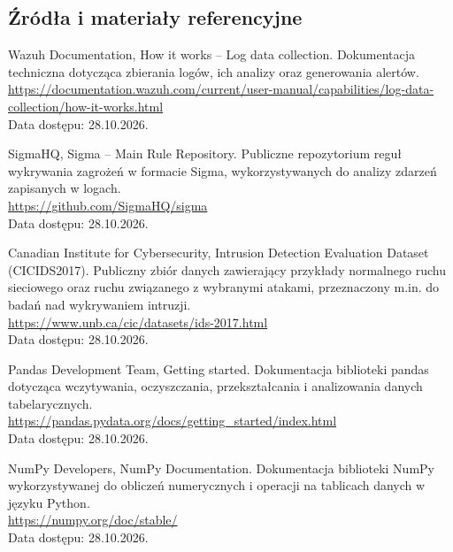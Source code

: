 \documentclass[11pt,a4paper,oneside]{article}
\newif\ifpodpowiedzi
\newcommand{\podpowiedz}[1]{\ifpodpowiedzi\par\begingroup\small\color{hintcolor}\textit{Wskazówka: #1}\par\endgroup\fi}
\begin{document}
\subsection{Źródła i materiały referencyjne}
\podpowiedz{Wskaż źródła wykorzystane przy opracowaniu koncepcji: dokumentację techniczną, publikacje, zbiory danych, zasoby i rozwiązania referencyjne. Dla stron internetowych podaj tytuł, adres i datę dostępu. Jeśli nie korzystano ze źródeł zewnętrznych, wpisz tę informację.}
{Wazuh Documentation, How it works – Log data collection. Dokumentacja techniczna dotycząca zbierania logów, ich analizy oraz generowania alertów.\\
\url{https://documentation.wazuh.com/current/user-manual/capabilities/log-data-collection/how-it-works.html}\\
Data dostępu: 28.10.2026.

SigmaHQ, Sigma – Main Rule Repository. Publiczne repozytorium reguł wykrywania zagrożeń w formacie Sigma, wykorzystywanych do analizy zdarzeń zapisanych w logach.\\
\url{https://github.com/SigmaHQ/sigma}\\
Data dostępu: 28.10.2026.

Canadian Institute for Cybersecurity, Intrusion Detection Evaluation Dataset (CICIDS2017). Publiczny zbiór danych zawierający przykłady normalnego ruchu sieciowego oraz ruchu związanego z wybranymi atakami, przeznaczony m.in. do badań nad wykrywaniem intruzji.\\
\url{https://www.unb.ca/cic/datasets/ids-2017.html}\\
Data dostępu: 28.10.2026.

Pandas Development Team, Getting started. Dokumentacja biblioteki pandas dotycząca wczytywania, oczyszczania, przekształcania i analizowania danych tabelarycznych.\\
\url{https://pandas.pydata.org/docs/getting\_started/index.html}\\
Data dostępu: 28.10.2026.

NumPy Developers, NumPy Documentation. Dokumentacja biblioteki NumPy wykorzystywanej do obliczeń numerycznych i operacji na tablicach danych w języku Python.\\
\url{https://numpy.org/doc/stable/ }\\
Data dostępu: 28.10.2026.
}
\end{document}
